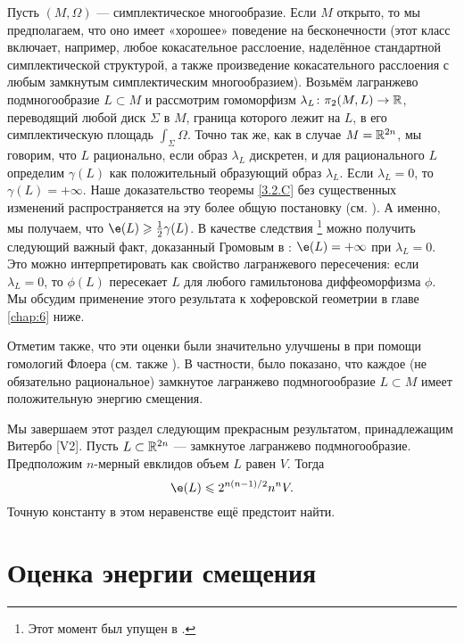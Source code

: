 \begin{thm}{}\label{3.2.G}
\end{thm}

Пусть $(M, \Omega)$ --- симплектическое многообразие.
Если $M$ открыто, то мы предполагаем, что оно имеет «хорошее» поведение на бесконечности (этот класс включает, например, любое кокасательное расслоение, наделённое стандартной симплектической структурой, а также произведение кокасательного расслоения с любым замкнутым симплектическим многообразием).
Возьмём лагранжево подмногообразие $L \subset M$ и рассмотрим гомоморфизм $\lambda_L\colon \pi_2 (M, L) \to \mathbb{R}$, переводящий любой диск $\Sigma$ в $M$, граница которого лежит на $L$, в его симплектическую площадь $\int_\Sigma \Omega$.
Точно так же, как в случае $M = \mathbb{R}^{2n}$, мы говорим, что $L$ рационально, если образ $\lambda_L$ дискретен, и для рационального $L$ определим $\gamma (L)$ как положительный образующий образ $\lambda_L$.
Если $\lambda_L = 0$, то  $\gamma (L) = + \infty$.
Наше доказательство теоремы \ref{3.2.C} без существенных изменений распространяется на эту более общую постановку (см. \cite{P1}).
А именно, мы получаем, что $\e (L) \ge \tfrac12 \gamma (L)$.
В качестве следствия%
\footnote{Этот момент был упущен в \cite[с. 359]{P1}.}
можно получить следующий важный факт, доказанный Громовым в \cite{G1}: $\e (L) = + \infty$ при $\lambda_L = 0$.
Это можно интерпретировать как свойство лагранжевого пересечения: если $\lambda_L = 0$, то $\phi (L)$ пересекает $L$ для любого гамильтонова диффеоморфизма $\phi$.
Мы обсудим применение этого результата к хоферовской геометрии в главе \ref{chap:6} ниже.

Отметим также, что эти оценки были значительно улучшены в \cite{Ch} при помощи гомологий Флоера (см. также \cite{O3}).
В частности, было показано, что каждое (не обязательно рациональное) замкнутое лагранжево подмногообразие $L \subset M$ имеет положительную энергию смещения.

\begin{thm}{}
\end{thm}

Мы завершаем этот раздел следующим прекрасным результатом, принадлежащим Витербо [V2].
Пусть $L \subset \mathbb{R}^{2n}$ --- замкнутое лагранжево подмногообразие.
Предположим $n$-мерный евклидов объем $L$ равен $V$.
Тогда 
\[\e (L) \le 2^{n(n-1)/2} n^n V.\]
Точную константу в этом неравенстве ещё предстоит найти. 

\section{Оценка энергии смещения}


